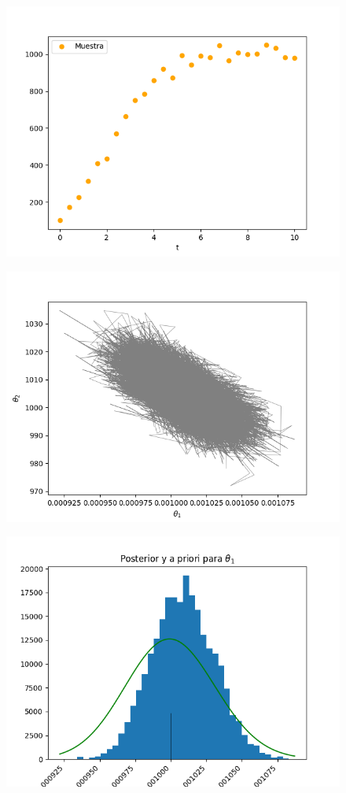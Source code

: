 \begin{figure}[H] 
    \centering 
    \includegraphics[width = 10 cm ]{img/Exp_Central_logistico_sigma/Figuras/Generales/Muestra_logistico_sigma.png} 
\end{figure} 


\begin{figure}[H] 
    \centering 
    \includegraphics[width = 10 cm ]{img/Exp_Central_logistico_sigma/Figuras/Generales/Conjunta_logistico_sigma.png} 
\end{figure} 


\begin{figure}[H] 
    \centering 
    \includegraphics[width = 10 cm ]{img/Exp_Central_logistico_sigma/Figuras/Generales/Post_theta1_logistico_sigma.png} 
\end{figure} 

